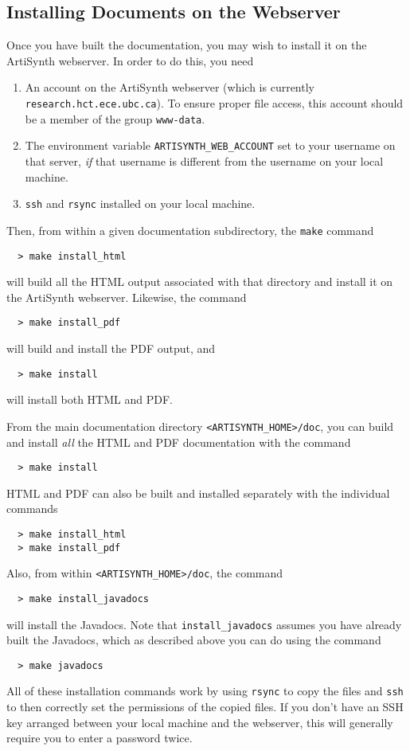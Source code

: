 \documentclass{article}
\begin{document}
\subsection{Installing Documents on the Webserver}
\label{InstallingSec}

Once you have built the documentation, you may wish to install it on the
ArtiSynth webserver. In order to do this, you need

\begin{enumerate}
\item An account on the ArtiSynth webserver (which is currently {\tt
research.hct.ece.ubc.ca}). To ensure proper file access, this account
should be a member of the group {\tt www-data}.
\item The environment variable {\tt ARTISYNTH\_WEB\_ACCOUNT} set to
your username on that server, {\it if} that username is different
from the username on your local machine.
\item {\tt ssh} and {\tt rsync} installed on your local machine.
\end{enumerate}

Then, from within a given documentation subdirectory, the {\tt make}
command
%
\begin {verbatim}
  > make install_html
\end{verbatim}
%
will build all the HTML output associated with that directory and install
it on the ArtiSynth webserver. Likewise, the command
%
\begin {verbatim}
  > make install_pdf
\end{verbatim}
%
will build and install the PDF output, and
%
\begin {verbatim}
  > make install
\end{verbatim}
%
will install both HTML and PDF.

From the main documentation directory {\tt <ARTISYNTH\_HOME>/doc}, you
can build and install {\it all} the HTML and PDF documentation with
the command
%
\begin{verbatim}
  > make install
\end{verbatim}
%
HTML and PDF can also be built and installed separately with the
individual commands
%
\begin {verbatim}
  > make install_html
  > make install_pdf
\end{verbatim}
%
Also, from within {\tt <ARTISYNTH\_HOME>/doc}, the command
%
\begin{verbatim}
  > make install_javadocs
\end{verbatim}
%
will install the Javadocs. Note that {\tt install\_javadocs} assumes
you have already built the Javadocs, which as described above you can
do using the command
%
\begin{verbatim}
  > make javadocs
\end{verbatim}
%
\begin{sideblock}
All of these installation commands work by using {\tt rsync}
to copy the files and
{\tt ssh} to then correctly set the permissions of the copied files.
If you don't have an SSH key arranged between your local machine
and the webserver, this will generally require 
you to enter a password twice.
\end{sideblock}
\end{document}
